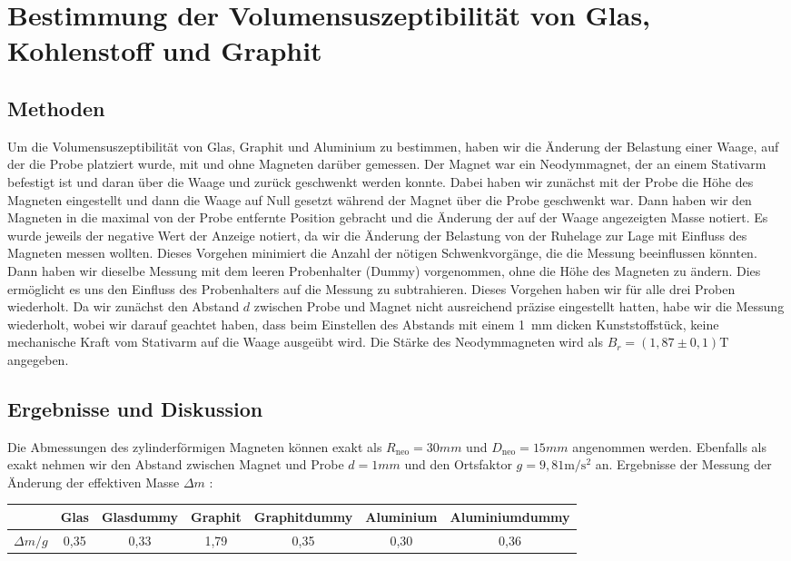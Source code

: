 \documentclass[
	a4paper,
	12pt,
	pagesize,
	ngerman
]{scrartcl}
\begin{document}
	\section{Bestimmung der Volumensuszeptibilität von Glas, Kohlenstoff und Graphit}
	\subsection{Methoden}
	Um die Volumensuszeptibilität von Glas, Graphit und Aluminium zu bestimmen, haben wir die Änderung der Belastung einer Waage, auf der die Probe platziert wurde, mit und ohne Magneten darüber gemessen. Der Magnet war ein Neodymmagnet, der an einem Stativarm befestigt ist und daran über die Waage und zurück geschwenkt werden konnte. Dabei haben wir zunächst mit der Probe die Höhe des Magneten eingestellt und dann die Waage auf Null gesetzt während der Magnet über die Probe geschwenkt war. Dann haben wir den Magneten in die maximal von der Probe entfernte Position gebracht und die Änderung der auf der Waage angezeigten Masse notiert. Es wurde jeweils der negative Wert der Anzeige notiert, da wir die Änderung der Belastung von der Ruhelage zur Lage mit Einfluss des Magneten messen wollten. Dieses Vorgehen minimiert die Anzahl der nötigen Schwenkvorgänge, die die Messung beeinflussen könnten. Dann haben wir dieselbe Messung mit dem leeren Probenhalter (Dummy) vorgenommen, ohne die Höhe des Magneten zu ändern. Dies ermöglicht es uns den Einfluss des Probenhalters auf die Messung zu subtrahieren. Dieses Vorgehen haben wir für alle drei Proben wiederholt. Da wir zunächst den Abstand $d$ zwischen Probe und Magnet nicht ausreichend präzise eingestellt hatten, habe wir die Messung wiederholt, wobei wir darauf geachtet haben, dass beim Einstellen des Abstands mit einem \SI{1}{\milli \meter} dicken Kunststoffstück, keine mechanische Kraft vom Stativarm auf die Waage ausgeübt wird. Die Stärke des Neodymmagneten wird als $B_r = (1,87 \pm 0,1 ) \si{\tesla}$ angegeben.
	\subsection{Ergebnisse und Diskussion}
	Die Abmessungen des zylinderförmigen Magneten können exakt als $R_\text{neo}=30 \si{mm}$ und $D_\text{neo}=15 \si{mm}$ angenommen werden. Ebenfalls als exakt nehmen wir den Abstand zwischen Magnet und Probe $d=1\si{mm}$ und den Ortsfaktor $g=9,81\si{\meter \per \second \squared}$ an. 
	\newline
	Ergebnisse der Messung der Änderung der effektiven Masse $\Delta m$ : \newline
	\begin{tabular}{ r | c | c | c | c | c | c |}
		 & Glas & Glasdummy & Graphit & Graphitdummy & Aluminium & Aluminiumdummy\\ \hline
		$\Delta m  \si{/g}$ & 0,35 &0,33 &1,79 & 0,35 & 0,30 & 0,36\\
	\end{tabular}
\end{document}
